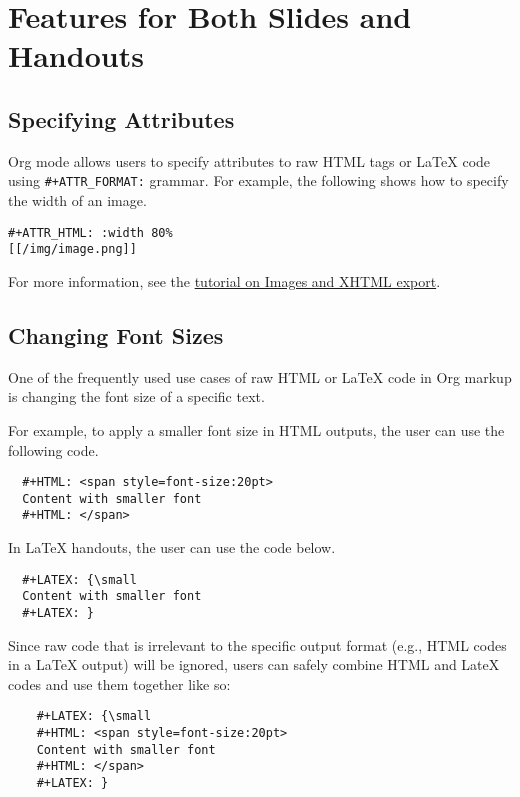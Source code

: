 \documentclass[10pt,article]{article}
\begin{document}
\section{Features for Both Slides and Handouts}
\label{sec:org2ecb7f4}
\subsection{Specifying Attributes}
\label{sec:orgb9b696d}
Org mode allows users to specify attributes to raw HTML tags or \LaTeX{} code
using \texttt{\#+ATTR\_FORMAT:} grammar. For example, the following shows how to 
specify the width of an image.

\begin{verbatim}
#+ATTR_HTML: :width 80%
[[/img/image.png]]
\end{verbatim}

For more information, see the \href{https://orgmode.org/worg/org-tutorials/images-and-xhtml-export.html}{tutorial on Images and XHTML export}.

\subsection{Changing Font Sizes}
\label{sec:org4d202c6}
One of the frequently used use cases of raw HTML or \LaTeX{} code in Org markup
is changing the font size of a specific text. 

For example, to apply a smaller
font size in HTML outputs, the user can use the following code.

\begin{verbatim}
  #+HTML: <span style=font-size:20pt>
  Content with smaller font
  #+HTML: </span>
\end{verbatim}

In \LaTeX{} handouts, the user can use the code below.

\begin{verbatim}
  #+LATEX: {\small
  Content with smaller font
  #+LATEX: }
\end{verbatim}

Since raw code that is irrelevant to the specific output format (e.g.,
HTML codes in a \LaTeX{} output) will be ignored, users can safely combine 
HTML and LateX codes and use them together like so:

\begin{verbatim}
    #+LATEX: {\small
    #+HTML: <span style=font-size:20pt>
    Content with smaller font
    #+HTML: </span>
    #+LATEX: }
\end{verbatim}
\end{document}
